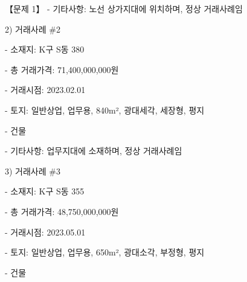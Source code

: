\begin{longquestion}{【문제 1】}
- 기타사항: 노선 상가지대에 위치하며, 정상 거래사례임 \par
2) 거래사례 \#2 \par
- 소재지: K구 S동 380 \par
- 총 거래가격: 71,400,000,000원 \par
- 거래시점: 2023.02.01 \par
- 토지: 일반상업, 업무용, 840m², 광대세각, 세장형, 평지 \par
- 건물 \par
{\small\centering
{}\par}

- 기타사항: 업무지대에 소재하며, 정상 거래사례임 \par
3) 거래사례 \#3 \par
- 소재지: K구 S동 355 \par
- 총 거래가격: 48,750,000,000원 \par
- 거래시점: 2023.05.01 \par
- 토지: 일반상업, 업무용, 650m², 광대소각, 부정형, 평지 \par
- 건물 \par
{\small\centering
{}\par}


\end{longquestion}
